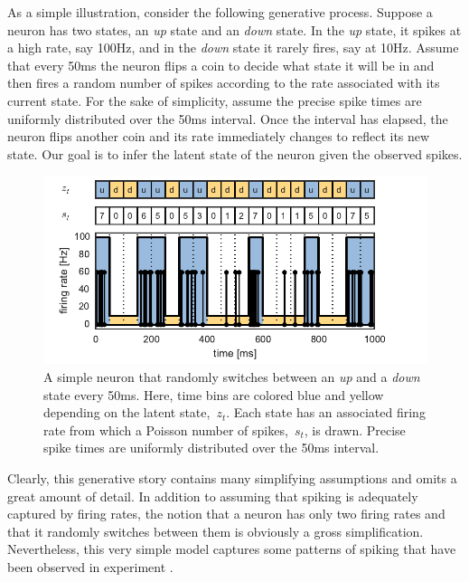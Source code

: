 As a simple illustration, consider the following generative
process. Suppose a neuron has two states, an \emph{up} state and an
\emph{down} state. In the \emph{up} state, it spikes at a high
rate, say 100Hz, and in the \emph{down} state it rarely fires, say at 10Hz.
Assume that every 50ms the neuron flips a coin to decide what state it
will be in and then fires a random number of spikes according to the
rate associated with its current state. For the sake of simplicity, 
assume the precise spike times are uniformly distributed over the 50ms
interval. Once the interval has elapsed, the neuron
flips another coin and its rate immediately changes to reflect its new
state.   Our goal is to infer the latent state of
the neuron given the observed spikes.

\begin{figure}[t]
\centering%
\includegraphics[width=5.5in]{figures/ch1/figure1} 
\caption[Simple neuron with up and down states]{A simple neuron that
  randomly switches between an \textit{up} and a \textit{down} state
  every 50ms. Here, time bins are colored blue and yellow depending on
  the latent state,~$z_t$. Each state has an associated firing rate from
  which a Poisson number of spikes,~$s_t$, is drawn. Precise spike
  times are uniformly distributed over the 50ms interval.}
\label{fig:updown}
\vspace{-0.5cm}
\end{figure}


Clearly, this generative story contains many simplifying assumptions
and omits a great amount of detail. In addition to assuming that
spiking is adequately captured by firing rates, the notion that a
neuron has only two firing rates and that it randomly switches between
them is obviously a gross simplification. Nevertheless, this very
simple model captures some patterns of spiking that have been observed
in experiment \cite{cowan1994spontaneous, shu2003turning}. 

